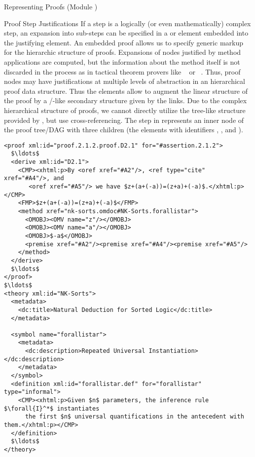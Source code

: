 \begin{tchapter}[id=proofs,short=Representing Proofs]{Representing Proofs (Module {})}
\begin{tsection}[id=proofs:justifications]{Proof Step Justifications}
  If a {} step is a logically (or even mathematically) complex step, an
  expansion into sub-steps can be specified in a {} or
  {} element embedded into the justifying {} element.
  An embedded proof allows us to specify generic markup for the hierarchic structure of
  proofs. Expansions of nodes justified by method applications are computed, but the
  information about the method itself is not discarded in the process as in tactical
  theorem provers like {\isabelle}~\cite{Paulson:iagtp94} or {\nuprl}~\cite{Constable86}.
  Thus, proof nodes may have justifications at multiple levels of abstraction in an
  hierarchical proof data structure.  Thus the {} elements allow to
  augment the linear structure of the proof by a {}/{}-like
  secondary structure given by the {} links. Due to the complex
  hierarchical structure of proofs, we cannot directly utilize the tree-like structure
  provided by {\xml}, but use cross-referencing.  The
  {} step in {} represents an inner node of the proof
  tree/DAG with three children (the elements with identifiers {},
  {}, and {}).

\begin{lstlisting}[label=lst:derive,mathescape,
  caption={A {\element{derive}} Proof Step},index={derive,method,premise}]
<proof xml:id="proof.2.1.2.proof.D2.1" for="#assertion.2.1.2">
  $\ldots$
  <derive xml:id="D2.1">
    <CMP><xhtml:p>By <oref xref="#A2"/>, <ref type="cite" xref="#A4"/>, and
       <oref xref="#A5"/> we have $z+(a+(-a))=(z+a)+(-a)$.</xhtml:p></CMP>
    <FMP>$z+(a+(-a))=(z+a)+(-a)$</FMP>
    <method xref="nk-sorts.omdoc#NK-Sorts.forallistar">
      <OMOBJ><OMV name="z"/></OMOBJ>
      <OMOBJ><OMV name="a"/></OMOBJ>
      <OMOBJ>$-a$</OMOBJ>
      <premise xref="#A2"/><premise xref="#A4"/><premise xref="#A5"/>
    </method>
  </derive>
  $\ldots$
</proof>
$\ldots$
<theory xml:id="NK-Sorts">
  <metadata>
    <dc:title>Natural Deduction for Sorted Logic</dc:title>
  </metadata>
  
  <symbol name="forallistar">
    <metadata>
      <dc:description>Repeated Universal Instantiation></dc:description>
    </metadata>
  </symbol>
  <definition xml:id="forallistar.def" for="forallistar" type="informal">
    <CMP><xhtml:p>Given $n$ parameters, the inference rule $\forall{I}^*$ instantiates 
      the first $n$ universal quantifications in the antecedent with them.</xhtml:p></CMP>
  </definition>
  $\ldots$
</theory>
\end{lstlisting}



\end{tsection}
\end{tchapter}
